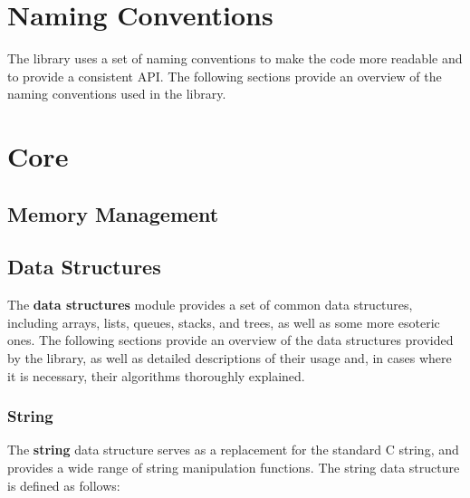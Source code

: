 \documentclass[a4paper,oneside,8pt]{extarticle}
\theoremstyle{definition}
\begin{document}
\section{Naming Conventions} \label{sec:naming_conventions}

The library uses a set of naming conventions to make the code more readable and to provide a consistent API. The following sections provide an overview of the naming conventions used in the library.

\section{Core} \label{sec:core}

\subsection{Memory Management}

\subsection{Data Structures}

The \textbf{data structures} module provides a set of common data structures, including arrays, lists, queues, stacks, and trees, as well as some more esoteric ones. The following sections provide an overview of the data structures provided by the library, as well as detailed descriptions of their usage and, in cases where it is necessary, their algorithms thoroughly explained.

\subsubsection{String}

The \textbf{string} data structure serves as a replacement for the standard C string, and provides a wide range of string manipulation functions. The string data structure is defined as follows: \newline
\end{document}
